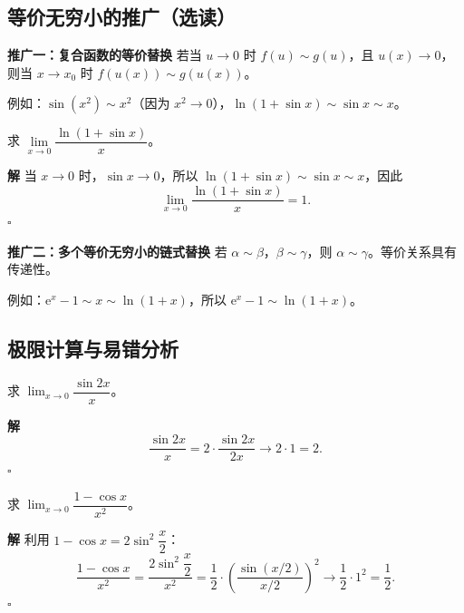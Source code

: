 \documentclass[fontset=fandol]{ctexart}
\newenvironment{extra}{\begin{mdframed}[style=extrastyle, frametitle={* 选读内容（不要求掌握）}]}{\end{mdframed}}
\newenvironment{custom}[1]{\par\noindent\textbf{#1}\quad}{\par\vspace{0.8em}}
\newenvironment{solution}{\par\noindent\textbf{解}\quad}{\hfill$\square$\par\vspace{0.8em}}
\newcommand{\ee}{\mathrm{e}}
\begin{document}
\Needspace{0.62\textheight}
\begin{extra}
\subsection*{等价无穷小的推广（选读）}


\begin{custom}{推广一：复合函数的等价替换}
若当 \(u \to 0\) 时 \(f(u) \sim g(u)\)，且 \(u(x) \to 0\)，则当 \(x \to x_0\) 时 \(f(u(x)) \sim g(u(x))\)。

例如：\(\sin(x^2) \sim x^2\)（因为 \(x^2 \to 0\)），\(\ln(1+\sin x) \sim \sin x \sim x\)。

\begin{example}
求 \(\lim\limits_{x \to 0} \dfrac{\ln(1 + \sin x)}{x}\)。
\end{example}
\begin{solution}
当 \(x \to 0\) 时，\(\sin x \to 0\)，所以 \(\ln(1+\sin x) \sim \sin x \sim x\)，因此
\[
\lim_{x \to 0} \dfrac{\ln(1+\sin x)}{x} = 1.
\]
\end{solution}
\end{custom}

\begin{custom}{推广二：多个等价无穷小的链式替换}
若 \(\alpha \sim \beta\)，\(\beta \sim \gamma\)，则 \(\alpha \sim \gamma\)。等价关系具有传递性。

例如：\(\ee^x - 1 \sim x \sim \ln(1+x)\)，所以 \(\ee^x - 1 \sim \ln(1+x)\)。
\end{custom}
\end{extra}


\iffalse

\subsection{极限计算与易错分析}

\begin{example}
求 \(\lim_{x \to 0} \dfrac{\sin 2x}{x}\)。
\end{example}

\begin{solution}
\[
\dfrac{\sin 2x}{x} = 2 \cdot \dfrac{\sin 2x}{2x} \to 2 \cdot 1 = 2.
\]
\end{solution}

\begin{example}
求 \(\lim_{x \to 0} \dfrac{1 - \cos x}{x^2}\)。
\end{example}

\begin{solution}
利用 \(1 - \cos x = 2 \sin^2 \dfrac{x}{2}\)：
\[
\dfrac{1 - \cos x}{x^2} = \dfrac{2 \sin^2 \dfrac{x}{2}}{x^2} = \dfrac{1}{2} \cdot \left( \dfrac{\sin (x/2)}{x/2} \right)^2 \to \dfrac{1}{2} \cdot 1^2 = \dfrac{1}{2}.
\]
\end{solution}
\end{document}
